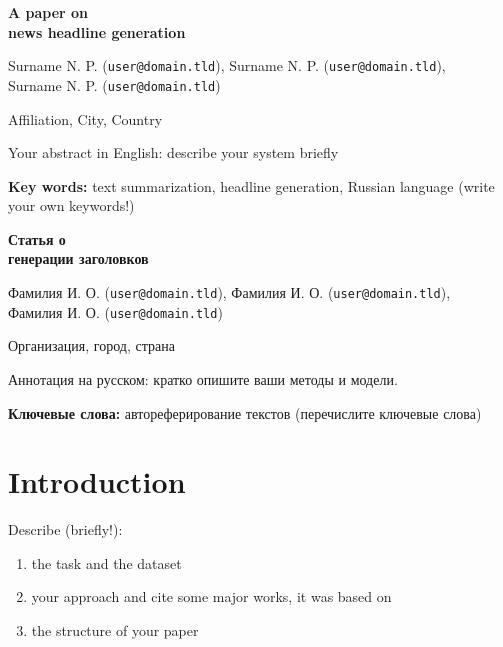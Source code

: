 \documentclass{dialogue}
\begin{document}
\begin{otherlanguage}{english}
\begin{center}
{\Large\bfseries{A paper on\\news headline generation}}

\medskip

Surname N. P. (\texttt{user@domain.tld}), Surname N. P. (\texttt{user@domain.tld}),\\Surname N. P. (\texttt{user@domain.tld})

\medskip

Affiliation, City, Country
\end{center}

Your abstract in English: describe your system briefly\medskip

\textbf{Key words:} text summarization, headline generation, Russian language (write your own keywords!)
\end{otherlanguage}

\bigskip

\begin{otherlanguage}{russian}
\begin{center}
{\Large\bfseries{Статья о\\генерации заголовков}}

\medskip

Фамилия И. О. (\texttt{user@domain.tld}), Фамилия И. О. (\texttt{user@domain.tld}),\\Фамилия И. О. (\texttt{user@domain.tld})

\medskip

Организация, город, страна
\end{center}

Аннотация на русском: кратко опишите ваши методы и модели.\medskip

\textbf{Ключевые слова:} автореферирование текстов  (перечислите  ключевые слова)
\end{otherlanguage}


\section{Introduction}
Describe (briefly!):
\begin{enumerate}
    \item the task and the dataset
    \item your approach and cite some major works, it was based on
    \item the structure of your paper
\end{enumerate}
\end{document}
